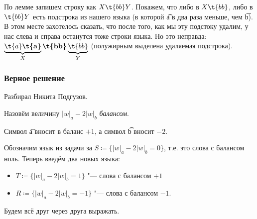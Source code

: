 		По лемме запишем строку как $X\t{bb}Y$.
		Покажем, что либо в $X\t{bb}$, либо в $\t{bb}Y$ есть подстрока из нашего языка
		(в которой \t{a} в два раза меньше, чем \t{b}).
		В этом месте захотелось сказать, что после того, как мы эту подстоку удалим,
		у нас слева и справа останутся тоже строки языка.
		Но это неправда: $\underbrace{\t{a}\textbf{\t{a}}}_{X}\textbf{\t{bb}}\underbrace{\t{bb}}_{Y}$
		(полужирным выделена удаляемая подстрока).

	\subsubsection{Верное решение}
		Разбирал Никита Подгузов.

		\begin{Def}
			Назовём величину $|w|_a - 2|w|_b$ \textit{балансом}.
		\end{Def}
		\begin{Rem}
			Символ \t{a} вносит в баланс $+1$, а символ \t{b} вносит $-2$.
		\end{Rem}
		Обозначим язык из задачи за $S \coloneq \{ |w|_a - 2|w|_b = 0 \}$, т.е. это слова с балансом ноль.
		Теперь введём два новых языка:
		\begin{itemize}
			\item $T \coloneq \{ |w|_a - 2|w|_b = 1 \}$ "--- слова с балансом $+1$
			\item $R \coloneq \{ |w|_a - 2|w|_b = -1 \}$ "--- слова с балансом $-1$.
		\end{itemize}
		Будем всё друг через друга выражать.
		

